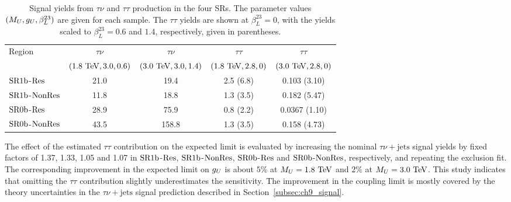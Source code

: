 \begin{table}[htbp]
    \centering
    \small
    \setlength{\tabcolsep}{3pt}
    \caption[$\tau\nu$ and $\tau\tau$ signal yields in the SRs]{Signal yields from $\tau\nu$ and $\tau\tau$ production in the four SRs. The parameter values $(M_U,g_U,\beta_L^{23})$ are given for each sample. The $\tau\tau$ yields are shown at $\beta_L^{23}=0$, with the yields scaled to $\beta_L^{23}=0.6$ and $1.4$, respectively, given in parentheses.}
    \label{tab:ch7_tautau_contamination}
    \begin{tabular}{lcccc}
        \toprule
        Region & $\tau\nu$ & $\tau\nu$ & $\tau\tau$ & $\tau\tau$ \\
        & $(1.8~\mathrm{TeV},3.0,0.6)$ & $(3.0~\mathrm{TeV},3.0,1.4)$ & $(1.8~\mathrm{TeV},2.8,0)$ & $(3.0~\mathrm{TeV},2.8,0)$ \\
        \midrule
        $\mathrm{SR1b}$-$\mathrm{Res}$ & 21.0 & 19.4 & 2.5 (6.8) & 0.103 (3.10) \\
        $\mathrm{SR1b}$-$\mathrm{NonRes}$ & 11.8 & 18.8 & 1.3 (3.5) & 0.182 (5.47) \\
        $\mathrm{SR0b}$-$\mathrm{Res}$ & 28.9 & 75.9 & 0.8 (2.2) & 0.0367 (1.10) \\
        $\mathrm{SR0b}$-$\mathrm{NonRes}$ & 43.5 & 158.8 & 1.3 (3.5) & 0.158 (4.73) \\
        \bottomrule
    \end{tabular}
\end{table}

The effect of the estimated $\tau\tau$ contribution on the expected limit is evaluated by increasing the nominal $\tau\nu+\mathrm{jets}$ signal yields by fixed factors of 1.37, 1.33, 1.05 and 1.07 in $\mathrm{SR1b}$-$\mathrm{Res}$, $\mathrm{SR1b}$-$\mathrm{NonRes}$, $\mathrm{SR0b}$-$\mathrm{Res}$ and $\mathrm{SR0b}$-$\mathrm{NonRes}$, respectively, and repeating the exclusion fit. The corresponding improvement in the expected limit on $g_U$ is about $5\%$ at $M_U=1.8~\mathrm{TeV}$ and $2\%$ at $M_U=3.0~\mathrm{TeV}$.
This study indicates that omitting the $\tau\tau$ contribution slightly underestimates the sensitivity. The improvement in the coupling limit is mostly covered by the theory uncertainties in the $\tau\nu+\mathrm{jets}$ signal prediction described in Section~\ref{subsec:ch9_signal}.
